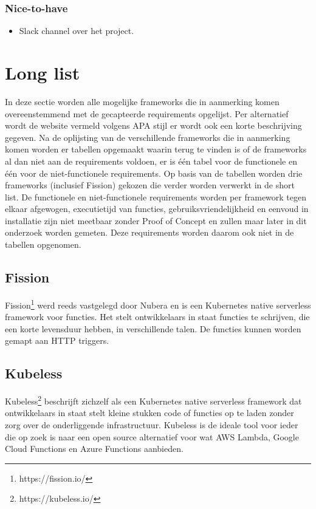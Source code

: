 \subsubsection{Nice-to-have}
\begin{itemize}
    \item Slack channel over het project.
\end{itemize}

\section{Long list}
In deze sectie worden alle mogelijke frameworks die in aanmerking komen overeenstemmend met de gecapteerde requirements opgelijst. Per alternatief wordt de website vermeld volgens APA stijl er wordt ook een korte beschrijving gegeven. Na de oplijsting van de verschillende frameworks die in aanmerking komen worden er tabellen opgemaakt waarin terug te vinden is of de frameworks al dan niet aan de requirements voldoen, er is één tabel voor de functionele en één voor de niet-functionele requirements. Op basis van de tabellen worden drie frameworks (inclusief Fission) gekozen die verder worden verwerkt in de short list. De functionele en niet-functionele requirements worden per framework tegen elkaar afgewogen, executietijd van functies, gebruiksvriendelijkheid en eenvoud in installatie zijn niet meetbaar zonder Proof of Concept en zullen maar later in dit onderzoek worden gemeten. Deze requirements worden daarom ook niet in de tabellen opgenomen.

\subsection{Fission}
Fission\footnote{https://fission.io/} werd reeds vastgelegd door Nubera en is een Kubernetes native serverless framework voor functies. Het stelt ontwikkelaars in staat functies te schrijven, die een korte levensduur hebben, in verschillende talen. De functies kunnen worden gemapt aan HTTP triggers.

\subsection{Kubeless}
Kubeless\footnote{https://kubeless.io/} beschrijft zichzelf als een Kubernetes native serverless framework dat ontwikkelaars in staat stelt kleine stukken code of functies op te laden zonder zorg over de onderliggende infrastructuur. Kubeless is de ideale tool voor ieder die op zoek is naar een open source alternatief voor wat AWS Lambda, Google Cloud Functions en Azure Functions aanbieden.

